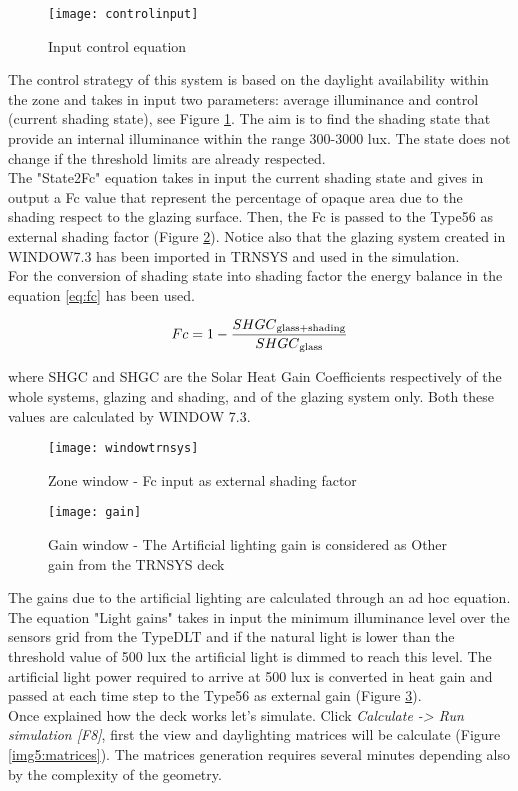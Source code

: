\begin{figure}[h]
\centering
\texttt{[image: controlinput]}
\caption{\label{img5:controlinput} Input control equation}
\end{figure}

The control strategy of this system is based on the daylight availability within the zone and takes in input two parameters: average illuminance and control (current shading state), see Figure \ref{img5:controlinput}. The aim is to find the shading state that provide an internal illuminance within the range 300-3000 lux. The state does not change if the threshold limits are already respected.\\
The "State2Fc" equation takes in input the current shading state and gives in output a Fc value that represent the percentage of opaque area due to the shading respect to the glazing surface. Then, the Fc is passed to the Type56 as external shading factor (Figure \ref{img5:windowtrnsys}). Notice also that the glazing system created in WINDOW7.3 has been imported in TRNSYS and used in the simulation. \\
For the conversion of shading state into shading factor the energy balance in the equation \ref{eq:fc} has been used.

\begin{equation}\label{eq:fc}
Fc = 1 - \dfrac{SHGC \textsubscript{glass+shading}}{SHGC \textsubscript{glass}}
\end{equation}

where SHGC  and SHGC  are the Solar Heat Gain Coefficients respectively of the whole systems, glazing and shading, and of the glazing system only. Both these values are calculated by WINDOW 7.3. 

\begin{figure}[h]
\centering
\texttt{[image: windowtrnsys]}
\caption{\label{img5:windowtrnsys} Zone window - Fc input as external shading factor}
\end{figure}

\begin{figure}[H]
\centering
\texttt{[image: gain]}
\caption{\label{img5:gain} Gain window - The Artificial lighting gain is considered as Other gain from the TRNSYS deck}
\end{figure}

The gains due to the artificial lighting are calculated through an ad hoc equation. The equation "Light gains" takes in input the minimum illuminance level over the sensors grid from the TypeDLT and if the natural light is lower than the threshold value of 500 lux the artificial light is dimmed to reach this level. The artificial light power required to arrive at 500 lux is converted in heat gain and passed at each time step to the Type56 as external gain (Figure \ref{img5:gain}). \\
Once explained how the deck works let's simulate. Click \textit{Calculate -> Run simulation [F8]}, first the view and daylighting matrices will be calculate (Figure \ref{img5:matrices}). The matrices generation requires several  minutes depending also by the complexity of the geometry.


